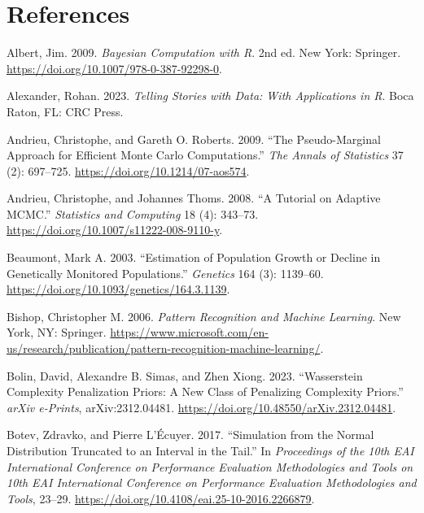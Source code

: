 \documentclass[
  11pt,
  letterpaper,
]{scrbook}
\newlength{\cslhangindent}
\newenvironment{CSLReferences}[2] %
 {\begin{list}{}{%
  \setlength{\itemindent}{0pt}
  \setlength{\leftmargin}{0pt}
  \setlength{\parsep}{0pt}
  \ifodd #1
   \setlength{\leftmargin}{\cslhangindent}
   \setlength{\itemindent}{-1\cslhangindent}
  \fi
  \setlength{\itemsep}{#2\baselineskip}}}
 {\end{list}}
\theoremstyle{definition}
\theoremstyle{plain}
\theoremstyle{plain}
\theoremstyle{plain}
\theoremstyle{definition}
\theoremstyle{definition}
\theoremstyle{remark}
\begin{document}

\chapter{References}\label{references}

\label{refs}
\begin{CSLReferences}{1}{0}
Albert, Jim. 2009. \emph{Bayesian Computation with {R}}. 2nd ed. New
York: Springer. \url{https://doi.org/10.1007/978-0-387-92298-0}.

Alexander, Rohan. 2023. \emph{Telling Stories with Data: With
Applications in {R}}. Boca Raton, FL: CRC Press.

Andrieu, Christophe, and Gareth O. Roberts. 2009. {``The Pseudo-Marginal
Approach for Efficient {M}onte {C}arlo Computations.''} \emph{The Annals
of Statistics} 37 (2): 697--725.
\url{https://doi.org/10.1214/07-aos574}.

Andrieu, Christophe, and Johannes Thoms. 2008. {``A Tutorial on Adaptive
{MCMC}.''} \emph{Statistics and Computing} 18 (4): 343--73.
\url{https://doi.org/10.1007/s11222-008-9110-y}.

Beaumont, Mark A. 2003. {``Estimation of Population Growth or Decline in
Genetically Monitored Populations.''} \emph{Genetics} 164 (3): 1139--60.
\url{https://doi.org/10.1093/genetics/164.3.1139}.

Bishop, Christopher M. 2006. \emph{Pattern Recognition and Machine
Learning}. New York, NY: Springer.
\url{https://www.microsoft.com/en-us/research/publication/pattern-recognition-machine-learning/}.

Bolin, David, Alexandre B. Simas, and Zhen Xiong. 2023. {``{W}asserstein
Complexity Penalization Priors: A New Class of Penalizing Complexity
Priors.''} \emph{arXiv e-Prints}, arXiv:2312.04481.
\url{https://doi.org/10.48550/arXiv.2312.04481}.

Botev, Zdravko, and Pierre L'Écuyer. 2017. {``Simulation from the Normal
Distribution Truncated to an Interval in the Tail.''} In
\emph{Proceedings of the 10th EAI International Conference on
Performance Evaluation Methodologies and Tools on 10th EAI International
Conference on Performance Evaluation Methodologies and Tools}, 23--29.
\url{https://doi.org/10.4108/eai.25-10-2016.2266879}.


\end{CSLReferences}
\end{document}
